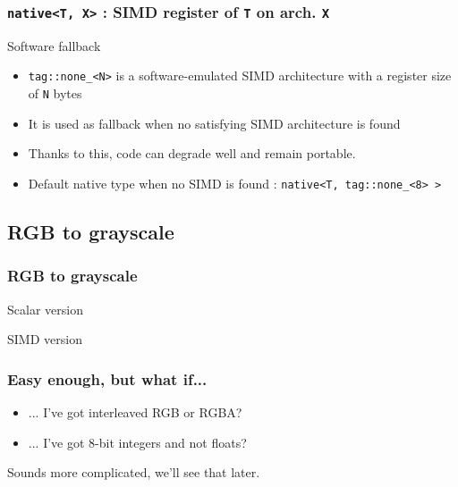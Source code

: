 \frame
{
\frametitle{\texttt{native<T, X>} : SIMD register of \texttt{T} on arch. \texttt{X}}
		
\begin{block}{Software fallback}
	\begin{itemize}\footnotesize
		\item \lstinline{tag::none_<N>} is a software-emulated SIMD architecture with a register size of \lstinline{N} bytes
		\item It is used as fallback when no satisfying SIMD architecture is found
		\item Thanks to this, code can degrade well and remain portable.
	\item Default native type when no SIMD is found : \lstinline{native<T, tag::none_<8> >}
	
	\end{itemize}
	\end{block}{}	
	}

\subsection{RGB to grayscale}
\frame
{
  \frametitle{RGB to grayscale}
  \begin{block}{Scalar version}
  \lstrgb
  \end{block}{}	

  \begin{block}{SIMD version}
  \lstrgbsimd
  \end{block}{}	
}

\begin{frame}
	\frametitle{Easy enough, but what if...}

	\begin{itemize}
		\item ... I've got interleaved RGB or RGBA?
		\item ... I've got 8-bit integers and not floats?
	\end{itemize}
	
	Sounds more complicated, we'll see that later.
	
\end{frame}